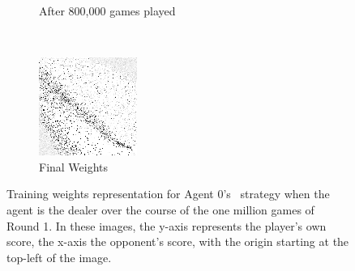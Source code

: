 \begin{figure}
\begin{subfigure}[t]{0.3\textwidth}
	\caption{After 800,000 games played}
	\end{subfigure}
	~
	\begin{subfigure}[t]{0.3\textwidth}
	\includegraphics[width=\textwidth]{images/findings/round1/flipbook_f.png}
	\caption{Final Weights}
	\end{subfigure}

\caption{%
	Training weights representation for Agent 0's \handmaxavg\
	strategy when the agent is the dealer
	over the course of the one million games of Round 1.
	In these images, the y-axis represents the player's own score,
	the x-axis the opponent's score,
	with the origin starting at the top-left of the image.
}
\label{fig_r1-flip}
\end{figure}
